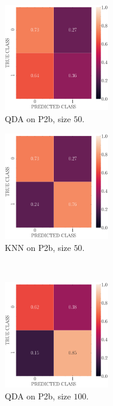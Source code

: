 \documentclass[11pt, a4 paper]{article}
\begin{document}
\begin{figure}[!htbp]
\centering
    \begin{subfigure}[!htbp]{0.24\textwidth}
       \centering
       \includegraphics[width=1.8in]{../results/ex2/conf_mtx_QD_ML_dataset_P2b_size_50.pdf}
       \caption{QDA on P2b, size $50$.}
       \label{fig:QDA_rr20_P2b_50}
    \end{subfigure}
\quad
    \begin{subfigure}[!htbp]{0.24\textwidth}
       \centering
       \includegraphics[width=1.8in]{../results/ex2/conf_mtx_KNN_dataset_P2b_size_50.pdf}
       \caption{KNN on P2b, size $50$.}
       \label{fig:KNN_rr20_P2b_50}
    \end{subfigure}
\\  
    \begin{subfigure}[!htbp]{0.24\textwidth}
       \centering
       \includegraphics[width=1.8in]{../results/ex2/conf_mtx_QD_ML_dataset_P2b_size_100.pdf}
       \caption{QDA on P2b, size $100$.}
       \label{fig:QDA_rr20_P2b_100}
    \end{subfigure}
\quad    
    \begin{subfigure}[!htbp]{0.24\textwidth}

\end{subfigure}
\end{figure}
\end{document}
